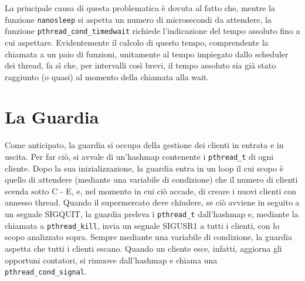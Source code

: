 \documentclass[a4paper,11pt,twoside] {article}
\begin{document}
La principale causa di questa problematica è dovuta al fatto che, mentre la funzione \lstinline{nanosleep} si aspetta un numero di microsecondi da attendere, la funzione \lstinline{pthread_cond_timedwait} richiede l'indicazione del tempo assoluto fino a cui aspettare. Evidentemente il calcolo di questo tempo, comprendente la chiamata a un paio di funzioni, unitamente al tempo impiegato dallo scheduler dei thread, fa sì che, per intervalli così brevi, il tempo assoluto sia già stato raggiunto (o quasi) al momento della chiamata alla wait.

\section*{La Guardia}

Come anticipato, la guardia si occupa della gestione dei clienti in entrata e in uscita. Per far ciò, si avvale di un'hashmap contenente i \lstinline{pthread_t} di ogni cliente. Dopo la sua inizializzazione, la guardia entra in un loop il cui scopo è quello di attendere (mediante una variabile di condizione) che il numero di clienti scenda sotto C - E, e, nel momento in cui ciò accade, di creare i nuovi clienti con annesso thread. Quando il supermercato deve chiudere, se ciò avviene in seguito a un segnale SIGQUIT, la guardia preleva i \lstinline{pthread_t} dall'hashmap e, mediante la chiamata a \lstinline{pthread_kill}, invia un segnale SIGUSR1 a tutti i clienti, con lo scopo analizzato sopra. Sempre mediante una variabile di condizione, la guardia aspetta che tutti i clienti escano. Quando un cliente esce, infatti, aggiorna gli opportuni contatori, si rimuove dall'hashmap e chiama una \lstinline{pthread_cond_signal}.
\end{document}
